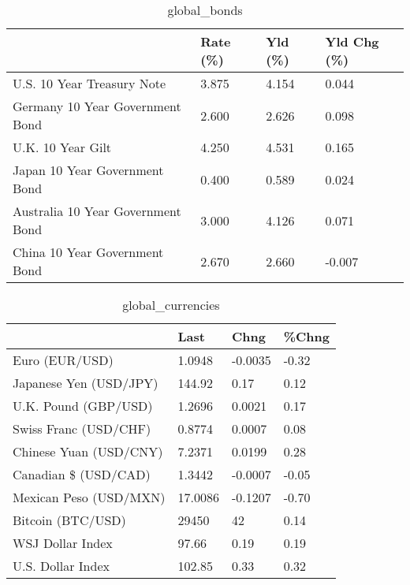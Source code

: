 \documentclass{article}%
\begin{document}
%


\begin{table}[htbp]%
\caption{global\_bonds}%
\centering%
\begin{adjustbox}{width=1\textwidth}%
\begin{tabular}{llll}
\toprule
                                  & Rate (\%) & Yld (\%) & Yld Chg (\%) \\
\midrule
       U.S. 10 Year Treasury Note &    3.875 &   4.154 &       0.044 \\
  Germany 10 Year Government Bond &    2.600 &   2.626 &       0.098 \\
                U.K. 10 Year Gilt &    4.250 &   4.531 &       0.165 \\
    Japan 10 Year Government Bond &    0.400 &   0.589 &       0.024 \\
Australia 10 Year Government Bond &    3.000 &   4.126 &       0.071 \\
    China 10 Year Government Bond &    2.670 &   2.660 &      -0.007 \\
\bottomrule
\end{tabular}
%
\end{adjustbox}%
\end{table}

%


\begin{table}[htbp]%
\caption{global\_currencies}%
\centering%
\begin{adjustbox}{width=1\textwidth}%
\begin{tabular}{llll}
\toprule
                       &    Last &    Chng & \%Chng \\
\midrule
        Euro (EUR/USD) &  1.0948 & -0.0035 & -0.32 \\
Japanese Yen (USD/JPY) &  144.92 &    0.17 &  0.12 \\
  U.K. Pound (GBP/USD) &  1.2696 &  0.0021 &  0.17 \\
 Swiss Franc (USD/CHF) &  0.8774 &  0.0007 &  0.08 \\
Chinese Yuan (USD/CNY) &  7.2371 &  0.0199 &  0.28 \\
  Canadian \$ (USD/CAD) &  1.3442 & -0.0007 & -0.05 \\
Mexican Peso (USD/MXN) & 17.0086 & -0.1207 & -0.70 \\
     Bitcoin (BTC/USD) &   29450 &      42 &  0.14 \\
      WSJ Dollar Index &   97.66 &    0.19 &  0.19 \\
     U.S. Dollar Index &  102.85 &    0.33 &  0.32 \\
\bottomrule
\end{tabular}
%
\end{adjustbox}%
\end{table}
\end{document}
